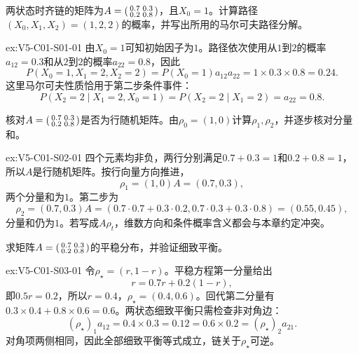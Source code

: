 \begin{SLChapterExercisePairSection}
\SLLectureSupplementExercises

\begin{exercise}\label{ex:V5-C01-S01-01}
两状态时齐链的矩阵为$A=\begin{psmallmatrix}0.7&0.3\\0.2&0.8\end{psmallmatrix}$，且$X_0=1$。计算路径$(X_0,X_1,X_2)=(1,2,2)$的概率，并写出所用的马尔可夫路径分解。
\end{exercise}
\ifSLFullEdition
{}\label{sol:V5-C01-S01-01}
\begin{chapterexercisesolution}{ex:V5-C01-S01-01}
\nopagebreak[4]
由$X_0=1$可知初始因子为$1$。路径依次使用从$1$到$2$的概率$a_{12}=0.3$和从$2$到$2$的概率$a_{22}=0.8$，因此
\[
P(X_0=1,X_1=2,X_2=2)
=P(X_0=1)a_{12}a_{22}=1\times0.3\times0.8=0.24.
\]
这里马尔可夫性质恰用于第二步条件事件：
\[
P(X_2=2\mid X_1=2,X_0=1)
=P(X_2=2\mid X_1=2)=a_{22}=0.8.
\]
\end{chapterexercisesolution}
\fi

\begin{exercise}\label{ex:V5-C01-S02-01}
核对$A=\begin{psmallmatrix}0.7&0.3\\0.2&0.8\end{psmallmatrix}$是否为行随机矩阵。由$\rho_0=(1,0)$计算$\rho_1,\rho_2$，并逐步核对分量和。
\end{exercise}
\ifSLFullEdition
{}\label{sol:V5-C01-S02-01}
\begin{chapterexercisesolution}{ex:V5-C01-S02-01}
四个元素均非负，两行分别满足$0.7+0.3=1$和$0.2+0.8=1$，所以$A$是行随机矩阵。按行向量方向推进，
\[
\rho_1=(1,0)A=(0.7,0.3),
\]
两个分量和为$1$。第二步为
\[
\rho_2=(0.7,0.3)A
=(0.7\cdot0.7+0.3\cdot0.2,
  0.7\cdot0.3+0.3\cdot0.8)
=(0.55,0.45),
\]
分量和仍为$1$。若写成$A\rho_t$，维数方向和条件概率含义都会与本章约定冲突。
\end{chapterexercisesolution}
\fi

\begin{exercise}\label{ex:V5-C01-S03-01}
求矩阵$A=\begin{psmallmatrix}0.7&0.3\\0.2&0.8\end{psmallmatrix}$的平稳分布，并验证细致平衡。
\end{exercise}
\ifSLFullEdition
{}\label{sol:V5-C01-S03-01}
\begin{chapterexercisesolution}{ex:V5-C01-S03-01}
令$\rho_\star=(r,1-r)$。平稳方程第一分量给出
\[
r=0.7r+0.2(1-r),
\]
即$0.5r=0.2$，所以$r=0.4$，$\rho_\star=(0.4,0.6)$。回代第二分量有$0.3\times0.4+0.8\times0.6=0.6$。两状态细致平衡只需检查非对角边：
\[
(\rho_\star)_1a_{12}=0.4\times0.3=0.12
=0.6\times0.2=(\rho_\star)_2a_{21}.
\]
对角项两侧相同，因此全部细致平衡等式成立，链关于$\rho_\star$可逆。
\end{chapterexercisesolution}
\fi


\end{SLChapterExercisePairSection}
